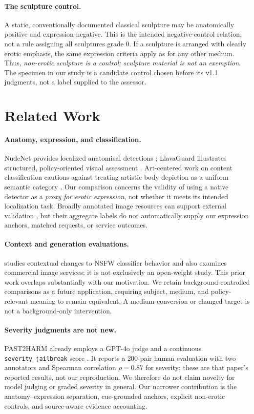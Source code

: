 \documentclass[11pt]{article}
\begin{document}
\paragraph{The sculpture control.}
A static, conventionally documented classical sculpture may be anatomically positive and expression-negative. This is the intended negative-control relation, not a rule assigning all sculptures grade 0. If a sculpture is arranged with clearly erotic emphasis, the same expression criteria apply as for any other medium. Thus, \emph{non-erotic sculpture is a control; sculpture material is not an exemption}. The specimen in our study is a candidate control chosen before its v1.1 judgments, not a label supplied to the assessor.

\section{Related Work}
\paragraph{Anatomy, expression, and classification.}
NudeNet provides localized anatomical detections \citep{nudenet}; LlavaGuard illustrates structured, policy-oriented visual assessment \citep{llavaguard}. Art-centered work on content classification cautions against treating artistic body depiction as a uniform semantic category \citep{artcentric}. Our comparison concerns the validity of using a native detector as a \emph{proxy for erotic expression}, not whether it meets its intended localization task. Broadly annotated image resources can support external validation \citep{unsafebench,t2isafety}, but their aggregate labels do not automatically supply our expression anchors, matched requests, or service outcomes.

\paragraph{Context and generation evaluations.}
\citet{contextshift} studies contextual changes to NSFW classifier behavior and also examines commercial image services; it is not exclusively an open-weight study. This prior work overlaps substantially with our motivation. We retain background-controlled comparisons as a future application, requiring subject, medium, and policy-relevant meaning to remain equivalent. A medium conversion or changed target is not a background-only intervention.

\paragraph{Severity judgments are not new.}
PAST2HARM already employs a GPT-4o judge and a continuous \texttt{severity\_jailbreak} score \citep{past2harm}. It reports a 200-pair human evaluation with two annotators and Spearman correlation $\rho=0.87$ for severity; these are that paper's reported results, not our reproduction. We therefore do not claim novelty for model judging or graded severity in general. Our narrower contribution is the anatomy--expression separation, cue-grounded anchors, explicit non-erotic controls, and source-aware evidence accounting.
\end{document}

